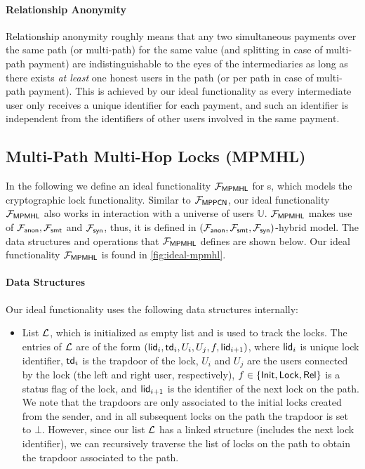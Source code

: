 \paragraph{Relationship Anonymity}
Relationship anonymity roughly means that any two simultaneous payments over the same path (or 
multi-path) for the same value (and splitting in case of multi-path payment) are 
indistinguishable to the eyes of the intermediaries as long as there exists \emph{at least} 
one honest users in the path (or per path in case of multi-path payment). 
This is achieved by 
our ideal functionality as every intermediate user only receives a unique identifier for 
each payment, and such an identifier is independent from the identifiers of other users involved 
in the same payment.

\subsection{Multi-Path Multi-Hop Locks (MPMHL)}
\label{sec:mpmhl}

In the following we define an ideal functionality $\mathcal{F}_{\mathsf{MPMHL}}$ for {\sysname}s, which 
models the cryptographic lock functionality. Similar to $\mathcal{F}_{\mathsf{MPPCN}}$, our ideal 
functionality $\mathcal{F}_{\mathsf{MPMHL}}$ also works in interaction with a universe of users 
$\mathbb{U}$.
$\mathcal{F}_{\mathsf{MPMHL}}$ makes use of $\mathcal{F}_{\mathsf{anon}}, \mathcal{F}_{\mathsf{smt}}$ and $\mathcal{F}_{\mathsf{syn}}$, thus, it is 
defined in $(\mathcal{F}_{\mathsf{anon}}, \mathcal{F}_{\mathsf{smt}}, \mathcal{F}_{\mathsf{syn}})$-hybrid model. The data structures and 
operations that $\mathcal{F}_{\mathsf{MPMHL}}$ defines are shown below. Our ideal functionality 
$\mathcal{F}_{\mathsf{MPMHL}}$ is found in \cref{fig:ideal-mpmhl}.

\paragraph{Data Structures}
Our ideal functionality uses the following data structures internally:

\begin{itemize}
	\item List $\mathcal{L}$, which is initialized as empty list and is used to track the locks. 
	The entries of $\mathcal{L}$ are of the form $(\mathsf{lid}_i, \mathsf{td}_i, U_i, U_j, f, \\ \mathsf{lid}_{i+1})$, 
	where $\mathsf{lid}_i$ is unique lock identifier, $\mathsf{td}_i$ is the trapdoor of the lock, $U_i$ 
	and $U_j$ are the users connected by the lock (the left and right user, respectively), 
	$f \in \{\mathsf{Init},\mathsf{Lock},\mathsf{Rel}\}$ is a status flag of the lock, and $\mathsf{lid}_{i+1}$ is the 
	identifier of the next lock on the path. We note that the trapdoors are only associated 
	to the initial locks created from the sender, and in all subsequent locks on the path the 
	trapdoor is set to $\bot$. However, since our list $\mathcal{L}$ has a linked structure (includes 
	the next lock identifier), we can recursively traverse the list of locks on the path to 
	obtain the trapdoor associated to the path.
\end{itemize}

